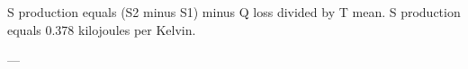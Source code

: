 S production equals (S2 minus S1) minus Q loss divided by T mean.  
S production equals 0.378 kilojoules per Kelvin.  

---